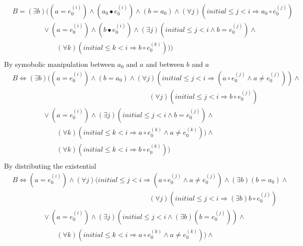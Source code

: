 \documentclass[a4paper,10pt]{article}
\newcommand{\idx}{\ensuremath{i}\xspace}
\newcommand{\idxinitial}{\ensuremath{\mathit{initial}}\xspace}
\newcommand{\at}[1]{{(#1)}}
\newcommand{\impl}{\ensuremath{\Longrightarrow}}
\newcommand{\Inv}[1]{\ensuremath{\mathit{Inv}(#1)\xspace}}
\newenvironment{proof}[1][Proof.]{\begin{trivlist}
\item[\hskip \labelsep {\bfseries #1}]}{\end{trivlist}}
\begin{document}
\begin{proof}
  \begin{align*}
    &B= (\exists b) ((a = e_0^\at{\idx}) \land (a_0 \bullet e_0^\at{\idx}) \land (b = a_0) \land (\forall j)(\idxinitial \leq j < \idx \impl a_0 \circ e_0^\at{j}) \\
    &\phantom{B= (a =} 
       \lor (a = e_0^\at{\idx}) \land  (b \bullet e_0^\at{\idx}) \land (\exists j)(\idxinitial \leq j < \idx \land b = e_0^\at{j}) \land \\
    &\phantom{B= (a = e_0^\at{\idx}} 
       (\forall k)(\idxinitial \leq k < \idx \impl b \circ e_0^\at{k}))) \\
  \end{align*}
  By symobolic manipulation between $a_0$ and $a$ and between $b$ and $a$
  \begin{align*}
    &B\Leftrightarrow (\exists b) ((a = e_0^\at{\idx}) \land (b = a_0) \land (\forall j)(\idxinitial \leq j < \idx \impl (a \circ e_0^\at{j} \land a \neq e_0^\at{j})) \land\\
    &\phantom{(a = e_0^\at{\idx}) \land (\exists b) ((b \bullet e_0^\at{\idx}) \land \Inv{\idx}} 
       (\forall j)(\idxinitial \leq j < \idx \impl b \circ e_0^\at{j})\\
    &\phantom{B= (a =} 
       \lor (a = e_0^\at{\idx}) \land (\exists j)(\idxinitial \leq j < \idx \land b = e_0^\at{j}) \land \\
    &\phantom{B= (a = e_0^\at{\idx}} 
       (\forall k)(\idxinitial \leq k < \idx \impl a \circ e_0^\at{k} \land a \neq e_0^\at{k})) \land\\
    &\phantom{B= (a = e_0^\at{\idx}} 
       (\forall k)(\idxinitial \leq k < \idx \impl b \circ e_0^\at{k})) \\
  \end{align*}
  By distributing the existential 
  \begin{align*}
    &B\Leftrightarrow (a = e_0^\at{\idx})  \land (\forall j)(\idxinitial \leq j < \idx \impl (a \circ e_0^\at{j} \land a \neq e_0^\at{j}) \land (\exists b) (b = a_0) \land \\
    &\phantom{(a = e_0^\at{\idx}) \land (\exists b) ((b \bullet e_0^\at{\idx}) \land \Inv{\idx}} 
       (\forall j)(\idxinitial \leq j < \idx \impl (\exists b) b \circ e_0^\at{j})\\
    &\phantom{B= (a =} 
       \lor (a = e_0^\at{\idx}) \land (\exists j)(\idxinitial \leq j < \idx \land (\exists b) (b = e_0^\at{j})) \land \\
    &\phantom{B= (a = e_0^\at{\idx}} 
       (\forall k)(\idxinitial \leq k < \idx \impl a \circ e_0^\at{k} \land a \neq e_0^\at{k})) \land \\

\end{align*}
\end{proof}
\end{document}

